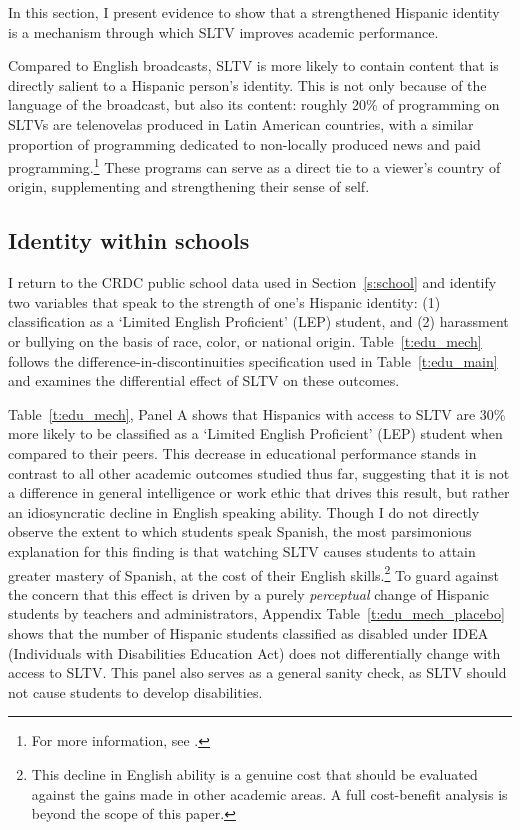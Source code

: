 \documentclass[11pt]{article}
\begin{document}
In this section, I present evidence to show that a strengthened Hispanic identity is a mechanism through which SLTV improves academic performance. 

Compared to English broadcasts, SLTV is more likely to contain content that is directly salient to a Hispanic person's identity. This is not only because of the language of the broadcast, but also its content: roughly 20\% of programming on SLTVs are telenovelas produced in Latin American countries, with a similar proportion of programming dedicated to non-locally produced news and paid programming.\footnote{ For more information, see \cite{noauthor_hispanic_2016}. } These programs can serve as a direct tie to a viewer's country of origin, supplementing and strengthening their sense of self. %


\subsection{Identity within schools}

I return to the CRDC public school data used in Section~\ref{s:school} and identify two variables that speak to the strength of one's Hispanic identity: (1) classification as a `Limited English Proficient' (LEP) student, and (2) harassment or bullying on the basis of race, color, or national origin. Table~\ref{t:edu_mech} follows the difference-in-discontinuities specification used in Table~\ref{t:edu_main} and examines the differential effect of SLTV on these outcomes.

Table~\ref{t:edu_mech}, Panel A shows that Hispanics with access to SLTV are 30\% more likely to be classified as a  `Limited English Proficient' (LEP) student when compared to their peers. This decrease in educational performance stands in contrast to all other academic outcomes studied thus far, suggesting that it is not a difference in general intelligence or work ethic that drives this result, but rather an idiosyncratic decline in English speaking ability. Though I do not directly observe the extent to which students speak Spanish, the most parsimonious explanation for this finding is that watching SLTV causes students to attain greater mastery of Spanish, at the cost of their English skills.\footnote{ This decline in English ability is a genuine cost that should be evaluated against the gains made in other academic areas. A full cost-benefit analysis is beyond the scope of this paper.} To guard against the concern that this effect is driven by a purely \textit{perceptual} change of Hispanic students by teachers and administrators, Appendix Table~\ref{t:edu_mech_placebo} shows that the number of Hispanic students classified as disabled under IDEA (Individuals with Disabilities Education Act) does not differentially change with access to SLTV. This panel also serves as a general sanity check, as SLTV should not cause students to develop disabilities. 
\end{document}
